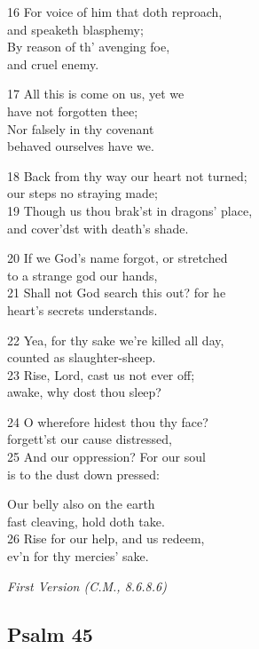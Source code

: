 \begin{multicols}{3}
16 For voice of him that doth reproach,\\
and speaketh blasphemy;\\
By reason of th’ avenging foe,\\
and cruel enemy.

17 All this is come on us, yet we\\
have not forgotten thee;\\
Nor falsely in thy covenant\\
behaved ourselves have we.

18 Back from thy way our heart not turned;\\
our steps no straying made;\\
19 Though us thou brak’st in dragons’ place,\\
and cover’dst with death’s shade.

20 If we God’s name forgot, or stretched\\
to a strange god our hands,\\
21 Shall not God search this out? for he\\
heart’s secrets understands.

22 Yea, for thy sake we’re killed all day,\\
counted as slaughter-sheep.\\
23 Rise, Lord, cast us not ever off;\\
awake, why dost thou sleep?

24 O wherefore hidest thou thy face?\\
forgett’st our cause distressed,\\
25 And our oppression? For our soul\\
is to the dust down pressed:

Our belly also on the earth\\
fast cleaving, hold doth take.\\
26 Rise for our help, and us redeem,\\
ev’n for thy mercies’ sake.

\begin{center}
\quad{}\quad{}
\end{center}

\emph{First Version (C.M., 8.6.8.6)}

\subsection*{Psalm 45}


\end{multicols}
